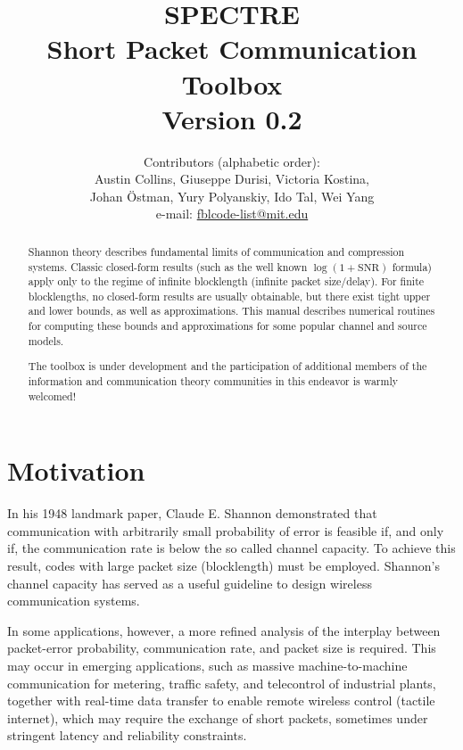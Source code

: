 \documentclass[a4paper,11p]{memoir}
\begin{document}
\title{SPECTRE\\
Short Packet Communication Toolbox\\[1cm]
Version 0.2}

\author{Contributors (alphabetic order):\\
Austin Collins, Giuseppe Durisi, Victoria Kostina, \\Johan \"Ostman, Yury Polyanskiy, Ido Tal, Wei Yang\\[10pt]
e-mail: \url{fblcode-list@mit.edu}}




\maketitle

\begin{abstract}

Shannon theory describes fundamental limits of communication and
compression systems. Classic closed-form results
(such as the well known $\log(1+\mathrm{SNR})$ formula)   apply only to the regime of infinite blocklength
(infinite packet size/delay). For finite blocklengths, no closed-form results are usually
obtainable, but there  exist tight upper and lower bounds, as well as
approximations. This manual describes numerical routines for  computing
these bounds and approximations for some popular channel and
source models.

The toolbox is under development and the participation of additional
members of the information and communication theory communities in
this endeavor is warmly welcomed!
\end{abstract}
\newpage
\tableofcontents

\newpage
\chapter{Motivation}
%
  In his 1948 landmark paper, Claude E. Shannon demonstrated that communication with arbitrarily small probability of error is feasible if, and only if, the communication rate is below the so called channel capacity. 
  To achieve this result, codes with large packet size (blocklength) must be employed. 
 Shannon's channel capacity has served as a useful guideline to design wireless communication systems.

In some applications, however, a more refined analysis of the interplay between packet-error probability, communication rate, and packet size is required.
  This may occur in emerging applications, such as massive machine-to-machine communication for metering, traffic safety, and telecontrol of industrial plants, together with real-time data transfer to enable remote wireless control (tactile internet), which may require the exchange of short packets, sometimes under stringent latency and reliability constraints.
  
\end{document}
